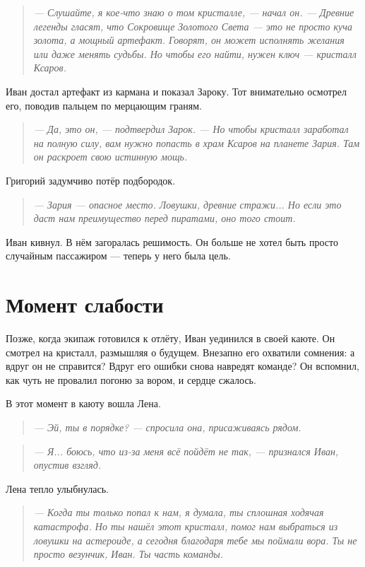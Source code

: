 \documentclass[12pt,a4paper]{book}
\newenvironment{dialogue}{\begin{quote}\itshape}{\end{quote}}
\begin{document}
\begin{dialogue}
--- Слушайте, я кое-что знаю о том кристалле, --- начал он. --- Древние легенды гласят, что Сокровище Золотого Света --- это не просто куча золота, а мощный артефакт. Говорят, он может исполнять желания или даже менять судьбы. Но чтобы его найти, нужен ключ --- кристалл Ксаров.
\end{dialogue}

Иван достал артефакт из кармана и показал Зароку. Тот внимательно осмотрел его, поводив пальцем по мерцающим граням.

\begin{dialogue}
--- Да, это он, --- подтвердил Зарок. --- Но чтобы кристалл заработал на полную силу, вам нужно попасть в храм Ксаров на планете Зария. Там он раскроет свою истинную мощь.
\end{dialogue}

Григорий задумчиво потёр подбородок.

\begin{dialogue}
--- Зария --- опасное место. Ловушки, древние стражи... Но если это даст нам преимущество перед пиратами, оно того стоит.
\end{dialogue}

Иван кивнул. В нём загоралась решимость. Он больше не хотел быть просто случайным пассажиром --- теперь у него была цель.

\section*{Момент слабости}

Позже, когда экипаж готовился к отлёту, Иван уединился в своей каюте. Он смотрел на кристалл, размышляя о будущем. Внезапно его охватили сомнения: а вдруг он не справится? Вдруг его ошибки снова навредят команде? Он вспомнил, как чуть не провалил погоню за вором, и сердце сжалось.

В этот момент в каюту вошла Лена.

\begin{dialogue}
--- Эй, ты в порядке? --- спросила она, присаживаясь рядом.
\end{dialogue}

\begin{dialogue}
--- Я... боюсь, что из-за меня всё пойдёт не так, --- признался Иван, опустив взгляд.
\end{dialogue}

Лена тепло улыбнулась.

\begin{dialogue}
--- Когда ты только попал к нам, я думала, ты сплошная ходячая катастрофа. Но ты нашёл этот кристалл, помог нам выбраться из ловушки на астероиде, а сегодня благодаря тебе мы поймали вора. Ты не просто везунчик, Иван. Ты часть команды.
\end{dialogue}
\end{document}
